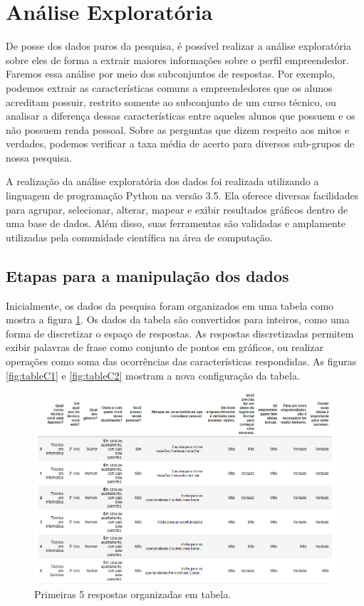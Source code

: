 \section{Análise Exploratória}
De posse dos dados puros da pesquisa, é possível realizar a análise exploratória sobre eles de forma a extrair maiores informações sobre o perfil empreendedor. Faremos essa análise por meio dos subconjuntos de respostas. Por exemplo, podemos extrair as características comuns a empreendedores que os alunos acreditam possuir, restrito somente ao subconjunto de um curso técnico, ou analisar a diferença dessas características entre aqueles alunos que possuem e os não possuem renda pessoal. Sobre as perguntas que dizem respeito aos mitos e verdades, podemos verificar a taxa média de acerto para diversos sub-grupos de nossa pesquisa.

A realização da análise exploratória dos dados foi realizada utilizando a linguagem de programação Python na versão 3.5. Ela oferece diversas facilidades para agrupar, selecionar, alterar, mapear e exibir resultados gráficos dentro de uma base de dados. Além disso, suas ferramentas são  validadas e amplamente utilizadas pela comunidade científica na área de computação.

\subsection{Etapas para a manipulação dos dados}
Inicialmente, os dados da pesquisa foram organizados em uma tabela como mostra a figura \ref{fig:tableB}. Os dados da tabela são convertidos para inteiros, como uma forma de discretizar o espaço de respostas. As respostas discretizadas permitem exibir palavras de frase como conjunto de pontos em gráficos, ou realizar operações como soma das ocorrências das características respondidas. As figuras \ref{fig:tableC1} e \ref{fig:tableC2} mostram a nova configuração da tabela.

\begin{figure}[!h]
    \centering
    \includegraphics[width=1.0\textwidth]{img/dataFrameBasic.PNG}
    \caption{Primeiras 5 respostas organizadas em tabela.}
    \label{fig:tableB}
\end{figure}

